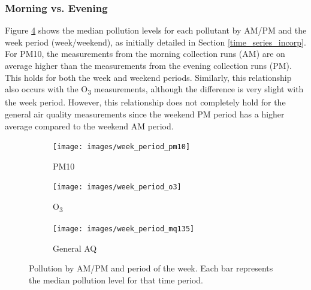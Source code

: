 \documentclass[11pt]{report}
\begin{document}
\subsubsection{Morning vs. Evening}

Figure \ref{fig:week_period_bars} shows the median pollution levels for each pollutant by AM/PM and the week period (week/weekend), as initially detailed in Section \ref{time_series_incorp}. For PM10, the measurements from the morning collection runs (AM) are on average higher than the measurements from the evening collection runs (PM). This holds for both the week and weekend periods. Similarly, this relationship also occurs with the O\textsubscript{3} measurements, although the difference is very slight with the week period. However, this relationship does not completely hold for the general air quality measurements since the weekend PM period has a higher average compared to the weekend AM period.

\begin{figure}[!tb]
    \centering
    \begin{minipage}{1\linewidth}
            \begin{subfigure}[t]{.45\linewidth}
                \texttt{[image: images/week\_period\_pm10]}
                \caption{PM10}
                \label{fig:week_period_pm10}
            \end{subfigure}
            \begin{subfigure}[t]{.45\linewidth}
            	\texttt{[image: images/week\_period\_o3]}
            	\caption{O\textsubscript{3}}
            	\label{fig:week_period_o3}
	   \end{subfigure}
        \end{minipage}
    \begin{minipage}{1\linewidth}
    	\centering
            \begin{subfigure}[t]{.45\linewidth}
                \texttt{[image: images/week\_period\_mq135]}
                \caption{General AQ}
                \label{fig:week_period_mq135}
            \end{subfigure}
        \end{minipage}
    \caption[Pollution by AM/PM and period of the week.]{Pollution by AM/PM and period of the week. Each bar represents the median pollution level for that time period.}
    \label{fig:week_period_bars}
\end{figure}


\end{document}
